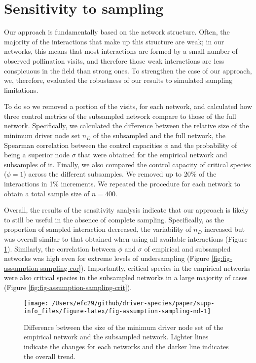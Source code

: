 \documentclass[a4paper]{artikel1}
\theoremstyle{definition}
\theoremstyle{definition}
\theoremstyle{definition}
\theoremstyle{remark}
\begin{document}
\clearpage

\section{Sensitivity to sampling}\label{undersampling}

Our approach is fundamentally based on the network structure. Often, the
majority of the interactions that make up this structure are weak; in
our networks, this means that most interactions are formed by a small
number of observed pollination visits, and therefore those weak
interactions are less conspicuous in the field than strong ones. To
strengthen the case of our approach, we, therefore, evaluated the
robustness of our results to simulated sampling limitations.

To do so we removed a portion of the visits, for each network, and
calculated how three control metrics of the subsampled network compare
to those of the full network. Specifically, we calculated the difference
between the relative size of the minimum driver node set \(n_D\) of the
subsampled and the full network, the Spearman correlation between the
control capacities \(\phi\) and the probability of being a superior node
\(\sigma\) that were obtained for the empirical network and subsamples
of it. Finally, we also compared the control capacity of critical
species (\(\phi=1\)) across the different subsamples. We removed up to
20\% of the interactions in 1\% increments. We repeated the procedure
for each network to obtain a total sample size of \(n=400\).

Overall, the results of the sensitivity analysis indicate that our
approach is likely to still be useful in the absence of complete
sampling. Specifically, as the proportion of sampled interaction
decreased, the variability of \(n_D\) increased but was overall similar
to that obtained when using all available interactions (Figure
\ref{fig:fig-assumption-sampling-nd}). Similarly, the correlation
between \(\phi\) and \(\sigma\) of empirical and subsampled networks was
high even for extreme levels of undersampling (Figure
\ref{fig:fig-assumption-sampling-cor}). Importantly, critical species in
the empirical networks were also critical species in the subsampled
networks in a large majority of cases (Figure
\ref{fig:fig-assumption-sampling-crit}).

\begin{figure}[p]

{\centering \texttt{[image: /Users/efc29/github/driver-species/paper/supp-info\_files/figure-latex/fig-assumption-sampling-nd-1]} 

}

\caption{Difference between the size of the minimum driver node set of the empirical network and the subsampled network. Lighter lines indicate the changes for each networks and the darker line indicates the overall trend.}\label{fig:fig-assumption-sampling-nd}
\end{figure}
\end{document}
